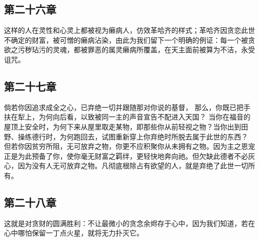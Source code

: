 
\subsection{第二十六章}

\par

这样的人在灵性和心灵上都被视为癞病人，仿效革哈齐的样式；革哈齐因贪恋此世不确定的财富，被可憎的癞病沾染，由此为我们留下一个明确的例证：每一个被贪欲之污秽玷污的灵魂，都被罪恶的属灵癞病所覆盖，在天主面前被算为不洁，永受诅咒。\par


\subsection{第二十七章}

\par

倘若你因追求成全之心，已弃绝一切并跟随那对你说的基督， 那么，你既已把手扶在犁上，为何向后看，以致被同一主的声音宣告不配进入天国？ 当你在福音的屋顶上安全时，为何下来从屋里取走某物，即那些你从前轻视之物？当你出到田野、操练德行时，为何跑回去，试图重新穿上你弃绝时所脱去属于此世的东西？ 但若你因贫穷所阻，无可放弃之物，你更不应积聚你从未拥有之物。因为主之恩宠正是为此预备了你，使你毫无财富之羁绊，更轻快地奔向祂。但欠缺此德者不必灰心，因为没有人无可放弃之物。凡彻底根除占有欲望的人，就是弃绝了此世一切所有。\par


\subsection{第二十八章}

\par

这就是对贪财的圆满胜利：不让最微小的贪念余烬存于心中，因为我们知道，若在心中哪怕保留一丁点火星，就将无力扑灭它。\par

